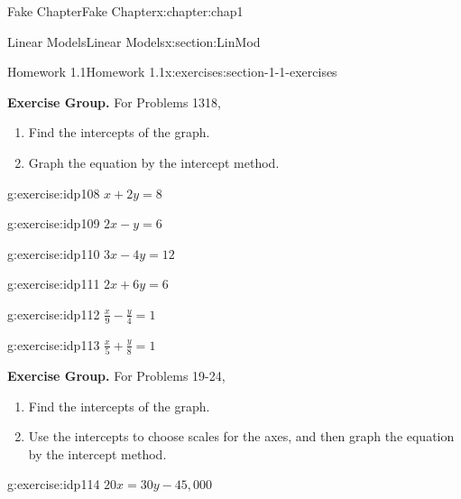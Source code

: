 \documentclass[oneside,10pt,]{book}
\numberwithin{equation}{section}
\begin{document}
\begin{chapterptx}{Fake Chapter}{}{Fake Chapter}{}{}{x:chapter:chap1}
\begin{sectionptx}{Linear Models}{}{Linear Models}{}{}{x:section:LinMod}
\begin{exercises-subsection}{Homework 1.1}{}{Homework 1.1}{}{}{x:exercises:section-1-1-exercises}
\par\medskip\noindent
\par\medskip\noindent%
\textbf{Exercise Group.}\space\space%
For Problems 13\textendash{}18,%
\begin{enumerate}[label=(\alph*)]
\item{}Find the intercepts of the graph.%
\item{}Graph the equation by the intercept method.%
\end{enumerate}
%
\begin{exercisegroupcol}{2}
\begin{divisionexerciseegcol}{13}{}{}{g:exercise:idp108}%
\(x + 2y = 8\)%
\end{divisionexerciseegcol}%
\begin{divisionexerciseegcol}{14}{}{}{g:exercise:idp109}%
\(2x - y = 6\)%
\end{divisionexerciseegcol}%
\begin{divisionexerciseegcol}{15}{}{}{g:exercise:idp110}%
\(3x - 4y =12\)%
\end{divisionexerciseegcol}%
\begin{divisionexerciseegcol}{16}{}{}{g:exercise:idp111}%
\(2x + 6y = 6\)%
\end{divisionexerciseegcol}%
\begin{divisionexerciseegcol}{17}{}{}{g:exercise:idp112}%
\(\displaystyle{\frac{x}{9}- \frac{y}{4}= 1}\)%
\end{divisionexerciseegcol}%
\begin{divisionexerciseegcol}{18}{}{}{g:exercise:idp113}%
\(\displaystyle{\frac{x}{5}+ \frac{y}{8}= 1}\)%
\end{divisionexerciseegcol}%
\end{exercisegroupcol}
\par\medskip\noindent
\par\medskip\noindent%
\textbf{Exercise Group.}\space\space%
For Problems 19-24,%
\begin{enumerate}[label=(\alph*)]
\item{}Find the intercepts of the graph.%
\item{}Use the intercepts to choose scales for the axes, and then graph the equation by the intercept method.%
\end{enumerate}
%
\begin{exercisegroupcol}{2}
\begin{divisionexerciseegcol}{19}{}{}{g:exercise:idp114}%
\(20x = 30y - 45,000\)%
\end{divisionexerciseegcol}%

\end{exercisegroupcol}
\end{exercises-subsection}
\end{sectionptx}
\end{chapterptx}
\end{document}
